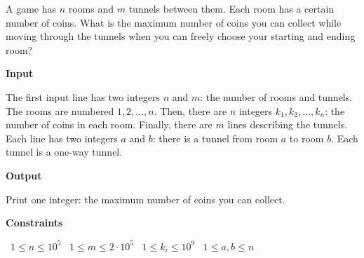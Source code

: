 A game has $n$ rooms and $m$ tunnels between them. Each room has a certain number of coins. What is the maximum number of coins you can collect while moving through the tunnels when you can freely choose your starting and ending room?

\vspace{0.3cm}\noindent\textbf{Input}

The first input line has two integers $n$ and $m$: the number of rooms and tunnels. The rooms are numbered $1,2,\dots,n$.
Then, there are $n$ integers $k_1,k_2,\ldots,k_n$: the number of coins in each room.
Finally, there are $m$ lines describing the tunnels. Each line has two integers $a$ and $b$: there is a tunnel from room $a$ to room $b$. Each tunnel is a one-way tunnel.

\vspace{0.3cm}\noindent\textbf{Output}

Print one integer: the maximum number of coins you can collect.

\vspace{0.3cm}\noindent\textbf{Constraints}

\textbullet\ $1 \le n \le 10^5$
\textbullet\ $1 \le m \le 2 \cdot 10^5$
\textbullet\ $1 \le k_i \le 10^9$
\textbullet\ $1 \le a,b \le n$